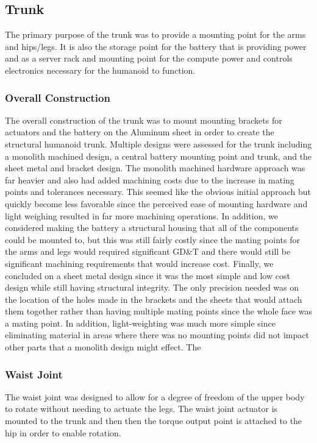 \documentclass{article}
\begin{document}
\subsection{Trunk}
The primary purpose of the trunk was to provide a mounting point for the arms and hips/legs. It is also the storage point for the battery that is providing power and as a server rack and mounting point for the compute power and controls electronics necessary for the humanoid to function. 

\subsubsection{Overall Construction}
The overall construction of the trunk was to mount mounting brackets for actuators and the battery on the Aluminum sheet in order to create the structural humanoid trunk. Multiple designs were assessed for the trunk including a monolith machined design, a central battery mounting point and trunk, and the sheet metal and bracket design. The monolith machined hardware approach was far heavier and also had added machining costs due to the increase in mating points and tolerances necessary. This seemed like the obvious initial approach but quickly become less favorable since the perceived ease of mounting hardware and light weighing resulted in far more machining operations. In addition, we considered making the battery a structural housing that all of the components could be mounted to, but this was still fairly costly since the mating points for the arms and legs would required significant GD&T and there would still be significant machining requirements that would increase cost. Finally, we concluded on a sheet metal design since it was the most simple and low cost design while still having structural integrity. The only precision needed was on the location of the holes made in the brackets and the sheets that would attach them together rather than having multiple mating points since the whole face was a mating point. In addition, light-weighting was much more simple since eliminating material in areas where there was no mounting points did not impact other parts that a monolith design might effect. The 

\subsubsection{Waist Joint}
The waist joint was designed to allow for a degree of freedom of the upper body to rotate without needing to actuate the legs. The waist joint actuator is mounted to the trunk and then then the torque output point is attached to the hip in order to enable rotation. 
\end{document}
